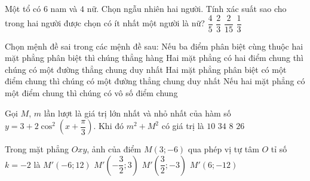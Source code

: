 \begin{ex}%
	Một tổ có $6$ nam và $4$ nữ. Chọn ngẫu nhiên hai người. Tính xác suất sao cho trong hai người được
	chọn có ít nhất một người là nữ?
	\choice
	{$\dfrac{4}{5}$}
	{\True $\dfrac{2}{3}$}
	{$\dfrac{2}{15}$}
	{$\dfrac{1}{3}$}
\end{ex}

\begin{ex}%
	Chọn mệnh đề sai trong các mệnh đề sau:
	\choice
	{Nếu ba điểm phân biệt cùng thuộc hai mặt phẳng phân biệt thì chúng thẳng hàng}
	{\True Hai mặt phẳng có hai điểm chung thì chúng có một đường thẳng chung duy nhất}
	{Hai mặt phẳng phân biệt có một điểm chung thì chúng có một đường thẳng chung duy nhất}
	{Nếu hai mặt phẳng có một điểm chung thì chúng có vô số điểm chung}
\end{ex}

\begin{ex}%
	Gọi $M$, $m$ lần lượt là giá trị lớn nhất và nhỏ nhất của hàm số $y= 3+2 \cos ^2 \left(x+ \dfrac{\pi}{3} \right) $. Khi đó $m^2 + M^2$ có giá trị là
	\choice
	{$10$}
	{\True $34$}
	{$8$}
	{$26$}
\end{ex}

\begin{ex}%
	Trong mặt phẳng $Oxy$, ảnh của điểm $M (3; -6  )$ qua phép vị tự tâm $O$ tỉ số $k = -2$ là
	\choice
	{\True $M'(-6;12)$}
	{$M'(-\dfrac{3}{2};3)$}
	{$M'(\dfrac{3}{2};-3)$}
	{$M'(6;-12)$}
\end{ex}

